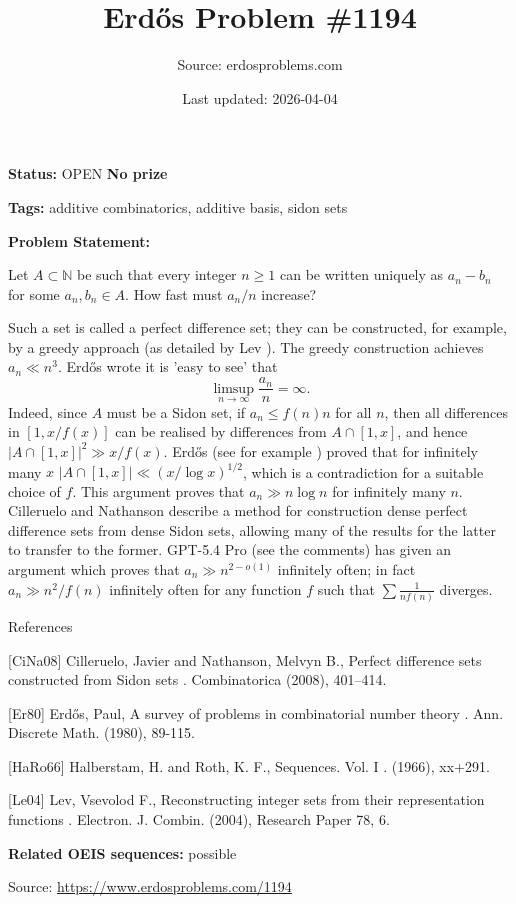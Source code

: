 \documentclass{article}
\title{Erd\H{o}s Problem \#1194}
\date{Last updated: 2026-04-04}
\author{Source: erdosproblems.com}
\begin{document}
\maketitle

\noindent\textbf{Status:} OPEN \quad \textbf{No prize}

\noindent\textbf{Tags:} additive combinatorics, additive basis, sidon sets

\medskip

\noindent\textbf{Problem Statement:}

Let $A\subset\mathbb{N}$ be such that every integer $n\geq 1$ can be written uniquely as $a_n-b_n$ for some $a_n,b_n\in A$. How fast must $a_n/n$ increase?




Such a set is called a perfect difference set; they can be constructed, for example, by a greedy approach (as detailed by Lev \cite{Le04}). The greedy construction achieves $a_n\ll n^3$. Erd\H{o}s \cite{Er80} wrote it is 'easy to see' that\[\limsup_{n\to \infty}\frac{a_n}{n}=\infty.\]Indeed, since $A$ must be a Sidon set, if $a_n \leq f(n)n$ for all $n$, then all differences in $[1,x/f(x)]$ can be realised by differences from $A\cap [1,x]$, and hence $\lvert A\cap [1,x]\rvert^2 \gg x/f(x)$. Erd\H{o}s (see for example \cite{HaRo66}) proved that for infinitely many $x$ $\lvert A\cap [1,x]\rvert \ll (x/\log x)^{1/2}$, which is a contradiction for a suitable choice of $f$. This argument proves that $a_n\gg n\log n$ for infinitely many $n$. Cilleruelo and Nathanson \cite{CiNa08} describe a method for construction dense perfect difference sets from dense Sidon sets, allowing many of the results for the latter to transfer to the former. GPT-5.4 Pro (see the comments) has given an argument which proves that $a_n\gg n^{2-o(1)}$ infinitely often; in fact $a_n \gg n^2/f(n)$ infinitely often for any function $f$ such that $\sum \frac{1}{nf(n)}$ diverges.




References

[CiNa08] Cilleruelo, Javier and Nathanson, Melvyn B., Perfect difference sets constructed from Sidon sets . Combinatorica (2008), 401--414.

[Er80] Erd\H{o}s, Paul, A survey of problems in combinatorial number theory . Ann. Discrete Math. (1980), 89-115.

[HaRo66] Halberstam, H. and Roth, K. F., Sequences. {V}ol. I . (1966), xx+291.

[Le04] Lev, Vsevolod F., Reconstructing integer sets from their representation functions . Electron. J. Combin. (2004), Research Paper 78, 6.

\noindent\textbf{Related OEIS sequences:} possible


\bigskip
\noindent\small{Source: \url{https://www.erdosproblems.com/1194}}
\end{document}
